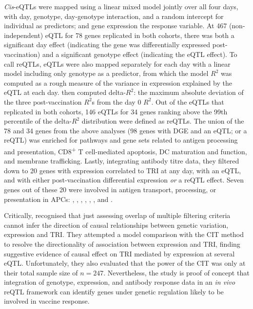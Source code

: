 \textit{Cis}-\glspl{eQTL} were mapped using a linear mixed model jointly over all four days,
with day, genotype, day-genotype interaction, and a random intercept for individual as predictors; and gene expression the response variable.
At 467 (non-independent) \gls{eQTL} for 78 genes replicated in both cohorts,
there was both a significant day effect (indicating the gene was differentially expressed post-vaccination)
and a significant genotype effect (indicating the \gls{eQTL} effect).
To call \glspl{reQTL}, \glspl{eQTL} were also mapped separately for each day with a linear model including only genotype as a predictor,
from which the model $R^2$ was computed as a rough measure of the variance in expression explained by the \gls{eQTL} at each day.
\textcite{franco2013IntegrativeGenomicAnalysis} then computed delta-$R^2$: the maximum absolute deviation of the three post-vaccination $R^2$s from the day 0 $R^2$.
Out of the \glspl{eQTL} that replicated in both cohorts, 
146 \glspl{eQTL} for 34 genes ranking above the 99th percentile of the delta-$R^2$ distribution were defined as \glspl{reQTL}.
The union of the 78 and 34 genes from the above analyses (98 genes with \gls{DGE} and an \gls{eQTL}; or a \gls{reQTL}) was enriched for pathways and gene sets related to  
antigen processing and presentation, CD8\textsuperscript{+} T cell-mediated apoptosis, \gls{DC} maturation and function, and membrane trafficking.
%
Lastly, integrating antibody titre data,
they filtered down to 20 genes with expression correlated to \gls{TRI} at any day, 
with an \gls{eQTL}, 
and with either post-vaccination differential expression \emph{or} a \gls{reQTL} effect.
Seven genes out of these 20 were involved in antigen transport, processing, or presentation in \glspl{APC}:
, , , , , , and .

Critically, \textcite{franco2013IntegrativeGenomicAnalysis} recognised that just assessing overlap of multiple filtering criteria cannot infer the direction of causal relationships between genetic variation, expression and \gls{TRI}.
They attempted a model comparison with the CIT \autocite{millstein2009DisentanglingMolecularRelationships} method to resolve the directionality of association between expression and \gls{TRI}, 
finding suggestive evidence of causal effect on \gls{TRI} mediated by expression at several \gls{eQTL}.
Unfortunately, they also evaluated that the power of the CIT was only  at their total sample size of $n=247$.
Nevertheless, the study is proof of concept that integration of genotype, expression, and antibody response data in an \textit{in vivo} \gls{reQTL} framework can identify genes under genetic regulation likely to be involved in vaccine response.


